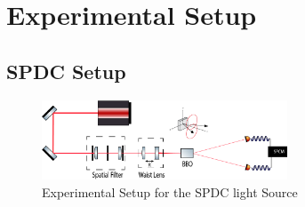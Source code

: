 
\chapter{Experimental Setup} %

\label{Chapter3} %

\section{SPDC Setup}

\begin{figure}[h!]
\centering
\includegraphics[width=0.65\textwidth]{Figures/SPDC.png}
\caption{Experimental Setup for the SPDC light Source} 
\label{fig:SPDC}
\end{figure}

